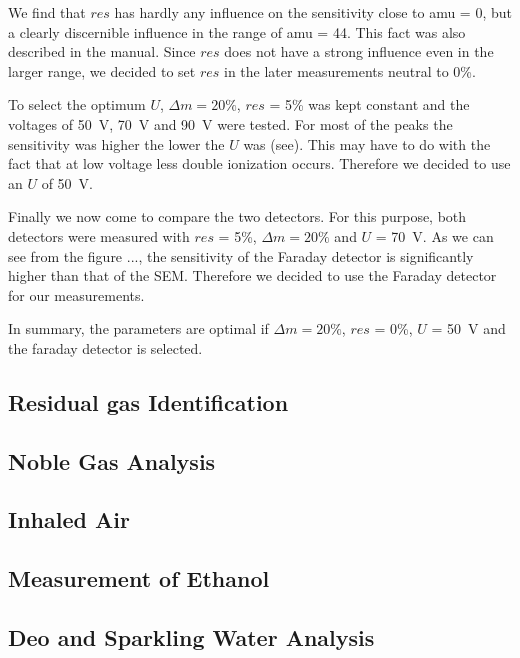    We find that $res$ has hardly any influence on the sensitivity close to amu = 0, but a clearly discernible influence in the range of amu = 44. This fact was also described in the manual. Since $res$ does not have a strong influence even in the larger range, we decided to set $res$ in the later measurements neutral to 0\%. 
    
    To select the optimum $U$, $\Delta m = 20 \%$, $res$ = 5\% was kept constant and the voltages of 50~V, 70~V and 90~V were tested. For most of the peaks the sensitivity was higher the lower the $U$ was (see). This may have to do with the fact that at low voltage less double ionization occurs. Therefore we decided to use an $U$ of 50~V.  
    
    Finally we now come to compare the two detectors. For this purpose, both detectors were measured with $res$ = 5\%, $\Delta m = 20\%$ and $U$ = 70~V. As we can see from the figure ..., the sensitivity of the Faraday detector is significantly higher than that of the SEM. Therefore we decided to use the Faraday detector for our measurements. 
    
    In summary, the parameters are optimal if $\Delta m = 20\%$, $res$ = 0\%, $U$ = 50~V and the faraday detector is selected. 
    
    
    \subsection{Residual gas Identification}
    \subsection{Noble Gas Analysis}
    \subsection{Inhaled Air}
    \subsection{Measurement of Ethanol}
    \subsection{Deo and Sparkling Water Analysis}